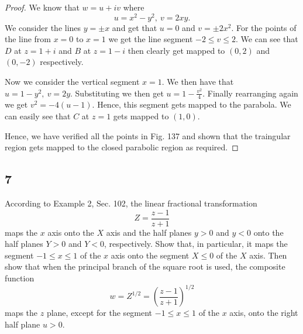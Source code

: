 \documentclass{article}
\begin{document}
\begin{proof}
    We know that $w = u + iv$ where
    \begin{equation*}
        u = x^2 - y^2, \ v = 2xy.
    \end{equation*}
    We consider the lines $y = \pm x$ and get that $u = 0$ and $v = \pm 2x^2$.
    For the points of the line from $x=0$ to $x=1$ we get the line segment
    $-2 \leq v \leq 2$. We can see that $D$ at $z = 1 + i$ and
    $B$ at $z = 1 - i$ then clearly get mapped to $(0,2)$ and $(0,-2)$ respectively.

    Now we consider the vertical segment $x = 1$. We then have that
    $u = 1 - y^2, \ v= 2y$. Substituting we then get $u = 1 - \frac{v^2}{4}$.
    Finally rearranging again we get $v^2 = -4(u-1)$. Hence, this segment gets
    mapped to the parabola. We can easily see that $C$ at $z = 1$ gets mapped
    to $(1, 0)$.

    Hence, we have verified all the points in Fig. 137 and shown that the
    traingular region gets mapped to the closed parabolic region as required.
\end{proof}

\subsection*{7}
According to Example 2, Sec. 102, the linear fractional transformation
\begin{equation*}
    Z = \frac{z-1}{z+1}
\end{equation*}
maps the $x$ axis onto the $X$ axis and the half planes $y > 0$ and $y<0$ onto the
half planes $Y>0$ and $Y< 0$, respectively. Show that, in particular, it maps the
segment $-1 \leq x \leq 1$ of the $x$ axis onto the segment $X\leq 0$ of the $X$
axis. Then show that when the principal branch of the square root is used, the
composite function
\begin{equation*}
    w = Z^{1/2} = \left(\frac{z-1}{z+1}\right)^{1/2}
\end{equation*}
maps the $z$ plane, except for the segment $-1 \leq x \leq 1$ of the $x$ axis,
onto the right half plane $u > 0$.
\end{document}
